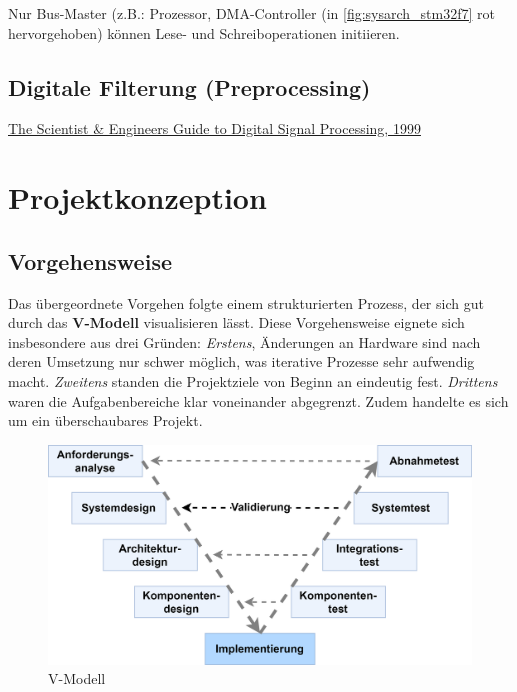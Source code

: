 \documentclass[a4paper, portrait, 12pt]{scrartcl} %
\begin{document}
Nur Bus-Master (z.B.: Prozessor, DMA-Controller (in \autoref{fig:sysarch_stm32f7} rot hervorgehoben) können Lese- und Schreiboperationen initiieren.

\pagebreak

\subsection{Digitale Filterung (Preprocessing)}
\href{https://www.analog.com/en/resources/technical-books/scientist_engineers_guide.html}{The Scientist \& Engineers Guide to Digital Signal Processing, 1999}

\pagebreak

\section{Projektkonzeption}
\subsection{Vorgehensweise}
Das übergeordnete Vorgehen folgte einem strukturierten Prozess, der sich gut durch das \textbf{V-Modell} visualisieren lässt. Diese Vorgehensweise eignete sich insbesondere aus drei Gründen: \emph{Erstens}, Änderungen an Hardware sind nach deren Umsetzung nur schwer möglich, was iterative Prozesse sehr aufwendig macht. \emph{Zweitens} standen die Projektziele von Beginn an eindeutig fest. \emph{Drittens} waren die Aufgabenbereiche klar voneinander abgegrenzt. Zudem handelte es sich um ein überschaubares Projekt.

\begin{figure}[H]
\centering
    \includegraphics[scale=0.14]{V_Modell.png} 
	\caption{V-Modell}
\end{figure}
\end{document}
